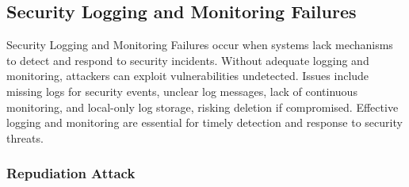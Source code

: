 \documentclass[]{article}
\begin{document}
\subsection{Security Logging and Monitoring Failures}

Security Logging and Monitoring Failures occur when systems lack mechanisms to detect and respond to security incidents. Without adequate logging and monitoring, attackers can exploit vulnerabilities undetected. Issues include missing logs for security events, unclear log messages, lack of continuous monitoring, and local-only log storage, risking deletion if compromised. Effective logging and monitoring are essential for timely detection and response to security threats.

\subsubsection{Repudiation Attack}
\end{document}
